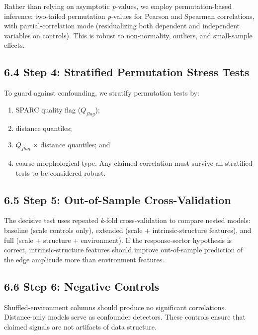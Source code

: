 Rather than relying on asymptotic \emph{p}-values, we employ permutation-based inference: two-tailed permutation \emph{p}-values for Pearson and Spearman correlations, with partial-correlation mode (residualizing both dependent and independent variables on controls). This is robust to non-normality, outliers, and small-sample effects.

\subsection{6.4 Step 4: Stratified Permutation Stress Tests}\label{step-4-stratified-permutation-stress-tests}

To guard against confounding, we stratify permutation tests by:

\begin{enumerate}
\def\labelenumi{(\roman{enumi})}
\item
  SPARC quality flag (\(Q_{flag}\));
\item
  distance quantiles;
\item
  \(Q_{flag}\) × distance quantiles; and
\item
  coarse morphological type. Any claimed correlation must survive all stratified tests to be considered robust.
\end{enumerate}

\subsection{6.5 Step 5: Out-of-Sample Cross-Validation}\label{step-5-out-of-sample-cross-validation}

The decisive test uses repeated \emph{k}-fold cross-validation to compare nested models: baseline (scale controls only), extended (scale + intrinsic-structure features), and full (scale + structure + environment). If the response-sector hypothesis is correct, intrinsic-structure features should improve out-of-sample prediction of the edge amplitude more than environment features.

\subsection{6.6 Step 6: Negative Controls}\label{step-6-negative-controls}

Shuffled-environment columns should produce no significant correlations. Distance-only models serve as confounder detectors. These controls ensure that claimed signals are not artifacts of data structure.

